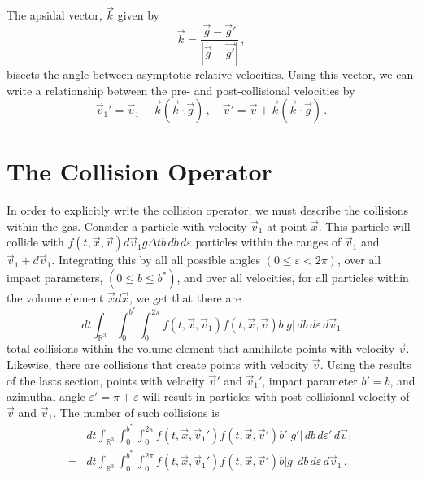 \documentclass[12pt]{CSUNthesis}
\def\R{\mathbb{R}}
\def\R{\mathbb{R}}
\newcommand{\vecx}{\vec{x}}
\newcommand{\vecv}{\vec{v}}
\begin{document}
The apsidal vector, $\vec{k}$ given by
\begin{equation*}
\vec{k} = \frac{\vec{g} - \vec{g}'}{|\vec{g} - \vec{g'}|}\, ,
\end{equation*}
bisects the angle between asymptotic relative velocities. Using this vector, we can write a relationship between the pre- and post-collisional velocities by
\begin{equation}
\label{eq:vel_relation}
\vec{v}_1' = \vec{v}_1 - \vec{k}(\vec{k} \cdot \vec{g})\, , \quad \vec{v}' = \vec{v} + \vec{k}(\vec{k} \cdot \vec{g})\, .
\end{equation}


\section{The Collision Operator}



In order to explicitly write the collision operator, we must describe the collisions within the gas. Consider a particle with velocity $\vecv_1$ at point $\vecx$. This particle will collide with $f(t,\vecx, \vecv)d\vecv_1 g \Delta t b \, db \, d\varepsilon$ particles within the ranges of $\vecv_1$ and $\vecv_1 + d\vecv_1$. Integrating this by all all possible angles $(0 \leq \varepsilon < 2 \pi)$, over all impact parameters, $(0 \leq b \leq b^*)$, and over all velocities, for all particles within the volume element $\vecx d\vecx$, we get that there are 
\begin{equation}
\label{eq:depletion}
dt \int_{\R^3} \int_0^{b^*} \int_0^{2\pi} f(t, \vecx, \vecv_1) f(t, \vecx, \vecv) b |g|\,  db \, d\varepsilon\, d\vecv_1 
\end{equation}
total collisions within the volume element that annihilate points with velocity $\vecv$. Likewise, there are collisions that create points with velocity $\vecv$. Using the results of the lasts section, points with velocity $\vecv'$ and $\vecv_1'$, impact parameter $b'=b$, and azimuthal angle $\varepsilon' = \pi + \varepsilon$ will result in particles with post-collisional velocity of $\vecv$ and $\vecv_1$. The number of such collisions is
\begin{equation}
\label{eq:restitution}
\begin{split}
&dt \int_{\R^3} \int_0^{b^*} \int_0^{2\pi} f(t, \vecx, \vecv_1') f(t, \vecx, \vecv') b' |g'|\,  db \, d\varepsilon'\, d\vecv_1 \,  \\
=&dt \int_{\R^3} \int_0^{b^*} \int_0^{2\pi} f(t, \vecx, \vecv_1') f(t, \vecx, \vecv') b |g|\,  db \, d\varepsilon\, d\vecv_1 \, .
\end{split}
\end{equation}
\end{document}
